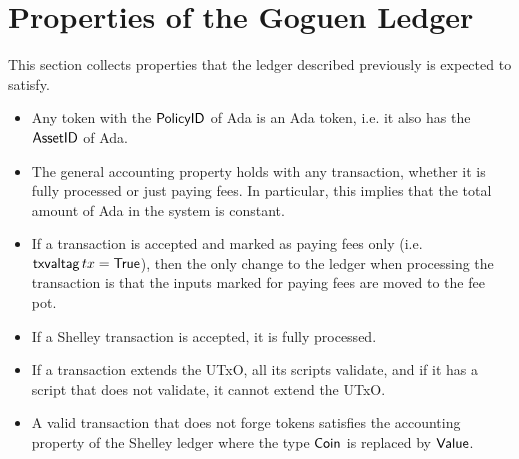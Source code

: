 \section{Properties of the Goguen Ledger}
\label{sec:properties}

This section collects properties that the ledger described previously
is expected to satisfy.

\begin{itemize}
\item Any token with the $\mathsf{PolicyID}$ of Ada is an Ada token, i.e. it
  also has the $\mathsf{AssetID}$ of Ada.
\item The general accounting property holds with any transaction,
  whether it is fully processed or just paying fees. In particular,
  this implies that the total amount of Ada in the system is constant.
\item If a transaction is accepted and marked as paying fees only
  (i.e. $\mathsf{txvaltag}\, tx = \mathsf{True}$), then the only change to the ledger
  when processing the transaction is that the inputs marked for paying
  fees are moved to the fee pot.
\item If a Shelley transaction is accepted, it is fully processed.
\item If a transaction extends the UTxO, all its scripts validate, and
  if it has a script that does not validate, it cannot extend the
  UTxO.
\item A valid transaction that does not forge tokens satisfies the
  accounting property of the Shelley ledger where the type $\mathsf{Coin}$ is
  replaced by $\mathsf{Value}$.
\end{itemize}
